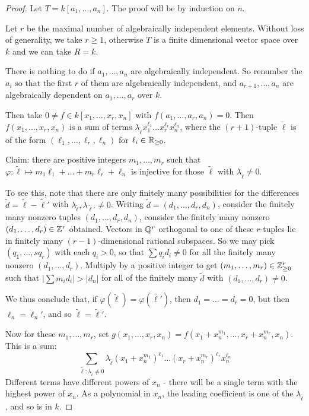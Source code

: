 \documentclass[10pt,a4paper]{article}
\begin{document}
\begin{proof}
  Let $T = k[a_1, \ldots, a_n]$. The proof will be by induction on $n$.

  Let $r$ be the maximal number of algebraically independent elements. Without loss of generality, we take $r \geq 1$, otherwise $T$ is a finite dimensional vector space over $k$ and we can take $R = k$.

  There is nothing to do if $a_1, \ldots, a_n$ are algebraically independent. So renumber the $a_i$ so that the first $r$ of them are algebraically independent, and $a_{r+1},\ldots, a_n$ are algebraically dependent on $a_1, \ldots, a_r$ over $k$.

  Then take $0 \neq f \in k[x_1, \ldots, x_r, x_n]$ with $f(a_1, \ldots, a_r, a_n) = 0$. Then $f(x_1, \ldots, x_r, x_n)$ is a  sum of terms $\lambda_{\tilde{\ell}}x_1^{\ell_1}\ldots x_r^{\ell_r}x_n^{\ell_n}$, where the $(r+1)$-tuple $\tilde{\ell}$ is of the form $(\ell_1, \ldots, \ell_r, \ell_n)$ for $\ell_i \in \mathbb{R}_{\geq 0}$.

  Claim: there are positive integers $m_1, \ldots, m_r$ such that $\varphi: \tilde{\ell} \mapsto m_1\ell_1+\ldots+m_r\ell_r+\ell_n$ is injective for those $\tilde{\ell}$ with $\lambda_{\tilde{\ell}} \neq 0$.

  To see this, note that there are only finitely many possibilities for the differences $\tilde{d} = \tilde{\ell} - \tilde{\ell}'$ with $\lambda_{\tilde{\ell}}, \lambda_{\tilde{\ell}'} \neq 0$. Writing $\tilde{d} = (d_1, \ldots, d_r, d_n)$, consider the finitely many nonzero tuples $(d_1, \ldots, d_r, d_n)$, consider the finitely many nonzero $(d_1, \ldots, d_r) \in \mathbb{Z}^r$ obtained.
  Vectors in $\mathbb{Q}^r$ orthogonal to one of these $r$-tuples lie in finitely many $(r-1)$-dimensional rational subspaces. So we may pick $(q_1, \ldots,s q_r)$ with each $q_i > 0$, so that $\sum q_i d_i \neq 0$ for all the finitely many nonzero $(d_1, \ldots, d_r)$. Multiply by a positive integer to get $(m_1, \ldots, m_r)\in \mathbb{Z}^r_{\geq 0}$ such that $|\sum m_id_i| > |d_n|$ for all of the finitely many $\tilde{d}$ with $(d_1, \ldots, d_r) \neq 0$.

  We thus conclude that, if $\varphi(\tilde{\ell}) = \varphi(\tilde{\ell'})$, then $d_1=\ldots = d_r = 0$, but then $\ell_n=\ell_n'$, and so $\tilde{\ell} = \tilde{\ell}'$.

  Now for these $m_1, \ldots, m_r$, set $g(x_1, \ldots, x_r, x_n) = f(x_1+x_n^{m_1}, \ldots, x_r+x_n^{m_r}, x_n)$. This is a sum:
  \[\sum_{\tilde{\ell}:\lambda_{\tilde{\ell}} \neq 0} \lambda_{\tilde{\ell}}(x_1 + x_n^{m_1})^{\ell_1}\ldots (x_r+x_n^{m_r})^{\ell_r}x_n^{\ell_n}\]
  Different terms have different powers of $x_n$ - there will be a single term with the highest power of $x_n$. As a polynomial in $x_n$, the leading coefficient is one of the $\lambda_{\tilde{\ell}}$, and so is in $k$.


\end{proof}
\end{document}
